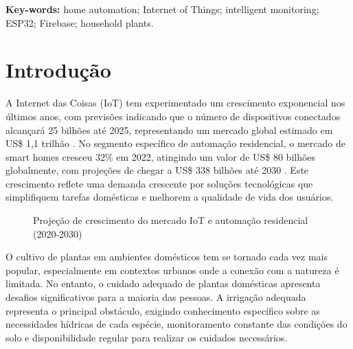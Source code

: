 \documentclass[twoside,english,brazilian]{UNISINOSmonografia}
\begin{document}
\medskip
\noindent\textbf{Key-words:} home automation; Internet of Things; intelligent monitoring; ESP32; Firebase; household plants.

\chapter{Introdução}

A Internet das Coisas (IoT) tem experimentado um crescimento exponencial nos últimos anos, com previsões indicando que o número de dispositivos conectados alcançará 25 bilhões até 2025, representando um mercado global estimado em US\$ 1,1 trilhão \cite{pacete2022iot}. No segmento específico de automação residencial, o mercado de smart homes cresceu 32\% em 2022, atingindo um valor de US\$ 80 bilhões globalmente, com projeções de chegar a US\$ 338 bilhões até 2030 \cite{fbi2025_smart_home_sa}. Este crescimento reflete uma demanda crescente por soluções tecnológicas que simplifiquem tarefas domésticas e melhorem a qualidade de vida dos usuários.

\begin{figure}[htbp]
\centering
\caption{Projeção de crescimento do mercado IoT e automação residencial (2020-2030)}
\label{fig:crescimento_mercado}
\end{figure}

O cultivo de plantas em ambientes domésticos tem se tornado cada vez mais popular, especialmente em contextos urbanos onde a conexão com a natureza é limitada. No entanto, o cuidado adequado de plantas domésticas apresenta desafios significativos para a maioria das pessoas. A irrigação adequada representa o principal obstáculo, exigindo conhecimento específico sobre as necessidades hídricas de cada espécie, monitoramento constante das condições do solo e disponibilidade regular para realizar os cuidados necessários.
\end{document}
